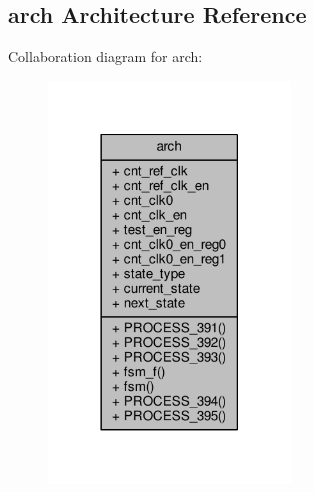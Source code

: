 \subsection{arch Architecture Reference}
\label{classsingl__clk__with__ref__test_1_1arch}


Collaboration diagram for arch\+:\nopagebreak
\begin{figure}[H]
\begin{center}
\leavevmode
\includegraphics[width=182pt]{d9/dc4/classsingl__clk__with__ref__test_1_1arch__coll__graph}
\end{center}
\end{figure}
